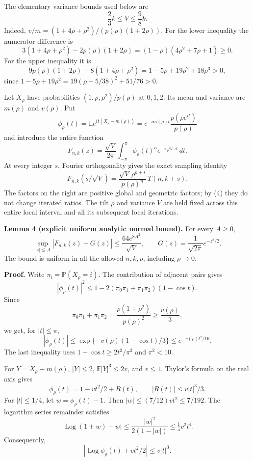 \documentclass[11pt,a4paper]{article}
\begin{document}
The elementary variance bounds used below are \[
 \frac23k\leq V\leq\frac98k. \tag{12}
\] Indeed, \(v/m=(1+4\rho+\rho^2)/(p(\rho)(1+2\rho))\). For the lower
inequality the numerator difference is \[
 3(1+4\rho+\rho^2)-2p(\rho)(1+2\rho)
 =(1-\rho)(4\rho^2+7\rho+1)\geq0.
\] For the upper inequality it is \[
 9p(\rho)(1+2\rho)-8(1+4\rho+\rho^2)
 =1-5\rho+19\rho^2+18\rho^3>0,
\] since \(1-5\rho+19\rho^2=19(\rho-5/38)^2+51/76>0\).

Let \(X_\rho\) have probabilities \((1,\rho,\rho^2)/p(\rho)\) at
\(0,1,2\). Its mean and variance are \(m(\rho)\) and \(v(\rho)\). Put \[
 \phi_\rho(t)=\mathbb E e^{it(X_\rho-m(\rho))}
 =e^{-im(\rho)t}\frac{p(\rho e^{it})}{p(\rho)}
\] and introduce the entire function \[
 F_{n,k}(z)=\frac{\sqrt V}{2\pi}\int_{-\pi}^{\pi}
 \phi_\rho(t)^n e^{-i\sqrt Vzt}\,dt. \tag{13}
\] At every integer \(s\), Fourier orthogonality gives the exact
sampling identity \[
 F_{n,k}(s/\sqrt V)=
 \frac{\sqrt V\,\rho^{k+s}}{p(\rho)^n}\,T(n,k+s). \tag{14}
\] The factors on the right are positive global and geometric factors;
by (4) they do not change iterated ratios. The tilt \(\rho\) and
variance \(V\) are held fixed across this entire local interval and all
its subsequent local iterations.

\textbf{Lemma 4 (explicit uniform analytic normal bound).} For every
\(A\geq0\), \[
 \sup_{|z|\leq A}
 \left|F_{n,k}(z)-G(z)\right|
 \leq\frac{64e^{8A^2}}{\sqrt V},
 \qquad G(z)=\frac1{\sqrt{2\pi}}e^{-z^2/2}. \tag{15}
\] The bound is uniform in all the allowed \(n,k,\rho\), including
\(\rho\to0\).

\textbf{Proof.} Write \(\pi_i=\mathbb P(X_\rho=i)\). The contribution of
adjacent pairs gives \[
 |\phi_\rho(t)|^2\leq
 1-2(\pi_0\pi_1+\pi_1\pi_2)(1-\cos t).
\] Since \[
 \pi_0\pi_1+\pi_1\pi_2
 =\frac{\rho(1+\rho^2)}{p(\rho)^2}\geq\frac{v(\rho)}3,
\] we get, for \(|t|\leq\pi\), \[
 |\phi_\rho(t)|\leq
 \exp\{-v(\rho)(1-\cos t)/3\}
 \leq e^{-v(\rho)t^2/16}. \tag{16}
\] The last inequality uses \(1-\cos t\geq2t^2/\pi^2\) and \(\pi^2<10\).

For \(Y=X_\rho-m(\rho)\), \(|Y|\leq2\), \(\mathbb E|Y|^3\leq2v\), and
\(v\leq1\). Taylor's formula on the real axis gives \[
 \phi_\rho(t)=1-vt^2/2+R(t),\qquad |R(t)|\leq v|t|^3/3.
\] For \(|t|\leq1/4\), let \(w=\phi_\rho(t)-1\). Then
\(|w|\leq(7/12)vt^2\leq7/192\). The logarithm series remainder satisfies
\[
 |\operatorname{Log}(1+w)-w|
 \leq\frac{|w|^2}{2(1-|w|)}
 \leq\tfrac15v^2t^4.
\] Consequently, \[
 |\operatorname{Log}\phi_\rho(t)+vt^2/2|\leq v|t|^3. \tag{17}
\]
\end{document}
